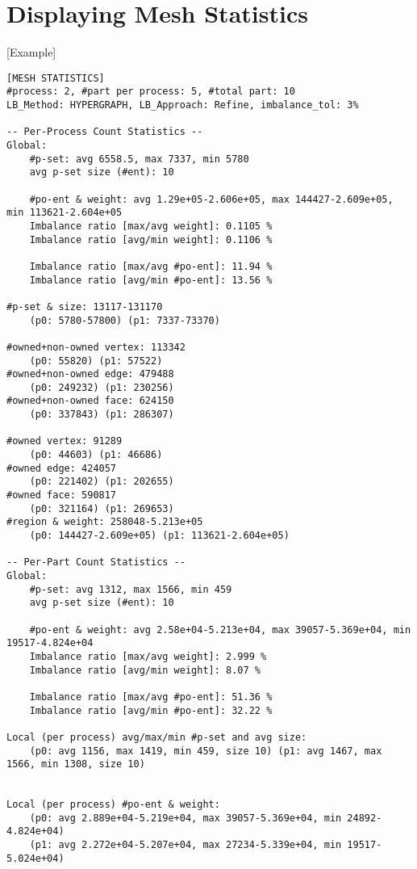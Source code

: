 
\section{Displaying Mesh Statistics}\label{sec:mstat}

[Example]
\begin{small}
\begin{verbatim}
[MESH STATISTICS]
#process: 2, #part per process: 5, #total part: 10
LB_Method: HYPERGRAPH, LB_Approach: Refine, imbalance_tol: 3%

-- Per-Process Count Statistics --
Global: 
	#p-set: avg 6558.5, max 7337, min 5780
	avg p-set size (#ent): 10

	#po-ent & weight: avg 1.29e+05-2.606e+05, max 144427-2.609e+05, min 113621-2.604e+05
	Imbalance ratio [max/avg weight]: 0.1105 %
	Imbalance ratio [avg/min weight]: 0.1106 %

	Imbalance ratio [max/avg #po-ent]: 11.94 %
	Imbalance ratio [avg/min #po-ent]: 13.56 %

#p-set & size: 13117-131170
	(p0: 5780-57800) (p1: 7337-73370) 

#owned+non-owned vertex: 113342
	(p0: 55820) (p1: 57522) 
#owned+non-owned edge: 479488
	(p0: 249232) (p1: 230256) 
#owned+non-owned face: 624150
	(p0: 337843) (p1: 286307) 

#owned vertex: 91289
	(p0: 44603) (p1: 46686) 
#owned edge: 424057
	(p0: 221402) (p1: 202655) 
#owned face: 590817
	(p0: 321164) (p1: 269653) 
#region & weight: 258048-5.213e+05
	(p0: 144427-2.609e+05) (p1: 113621-2.604e+05) 

-- Per-Part Count Statistics --
Global: 
	#p-set: avg 1312, max 1566, min 459
	avg p-set size (#ent): 10

	#po-ent & weight: avg 2.58e+04-5.213e+04, max 39057-5.369e+04, min 19517-4.824e+04
	Imbalance ratio [max/avg weight]: 2.999 %
	Imbalance ratio [avg/min weight]: 8.07 %

	Imbalance ratio [max/avg #po-ent]: 51.36 %
	Imbalance ratio [avg/min #po-ent]: 32.22 %

Local (per process) avg/max/min #p-set and avg size:
	(p0: avg 1156, max 1419, min 459, size 10) (p1: avg 1467, max 1566, min 1308, size 10) 
	

Local (per process) #po-ent & weight:
	(p0: avg 2.889e+04-5.219e+04, max 39057-5.369e+04, min 24892-4.824e+04) 
    (p1: avg 2.272e+04-5.207e+04, max 27234-5.339e+04, min 19517-5.024e+04) 
	


\end{verbatim}
\end{small}
